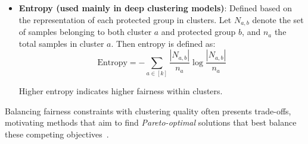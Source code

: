 \begin{itemize}
\item \textbf{Entropy (used mainly in deep clustering models)}: Defined based on the representation of each protected group in clusters. Let \(N_{a,b}\) denote the set of samples belonging to both cluster \(a\) and protected group \(b\), and \(n_a\) the total samples in cluster \(a\). Then entropy is defined as:
\[
\text{Entropy} = -\sum_{a \in [k]} \frac{|N_{a,b}|}{n_a} \log \frac{|N_{a,b}|}{n_a}
\]

Higher entropy indicates higher fairness within clusters.

\end{itemize}

Balancing fairness constraints with clustering quality often presents trade-offs, motivating methods that aim to find \emph{Pareto-optimal} solutions that best balance these competing objectives~\cite{ChhabraOverview}.
